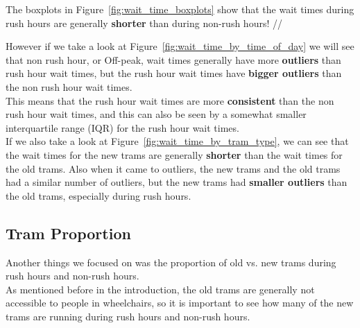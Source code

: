 \documentclass[a4paper, 10pt]{article}
\begin{document}
				\noindent The boxplots in Figure~\ref{fig:wait_time_boxplots} show that the wait times during
				rush hours are generally \textbf{shorter} than during non-rush hours! //

				\noindent However if we take a look at Figure~\ref{fig:wait_time_by_time_of_day} we will see that 
				non rush hour, or Off-peak, wait times generally have more \textbf{outliers} than rush hour wait times, but
				the rush hour wait times have \textbf{bigger outliers} than the non rush hour wait times. \\

				\noindent This means that the rush hour wait times are more \textbf{consistent} 
				than the non rush hour wait times, and this can also be seen by a somewhat smaller interquartile range (IQR) 
				for the rush hour wait times. \\

				\noindent If we also take a look at Figure~\ref{fig:wait_time_by_tram_type}, 
				we can see that the wait times for the new trams are generally 
				\textbf{shorter} than the wait times for the old trams. Also when it came to outliers, 
				the new trams and the old trams had a similar number of outliers, 
				but the new trams had \textbf{smaller outliers} than the old trams, especially during rush hours. \\

		\newpage
		\subsection{Tram Proportion}
				\noindent Another things we focused on was the proportion of old vs. new trams during rush hours and non-rush hours. \\

				\noindent As mentioned before in the introduction, the old trams are generally not accessible to people in wheelchairs,
				so it is important to see how many of the new trams are running during rush hours and non-rush hours. \\
\end{document}
